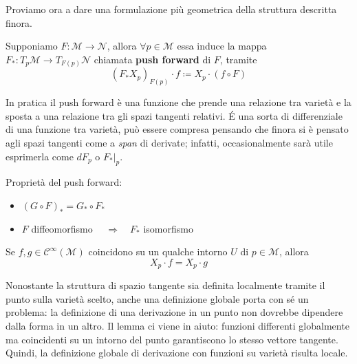 Proviamo ora a dare una formulazione più geometrica della struttura descritta finora.
\begin{definition}
    Supponiamo $F : \mathcal{M} \rightarrow \mathcal{N}$, allora $\forall p \in \mathcal{M}$ essa induce la mappa $F_* : T_p\mathcal{M} \rightarrow T_{F(p)}\mathcal{N}$ chiamata \textbf{push forward} di $F$, tramite
    \begin{equation}
        (F_* X_p)_{F(p)} \cdot f \coloneqq X_p \cdot (f \circ F)
    \end{equation}
\end{definition}
In pratica il push forward è una funzione che prende una relazione tra varietà e la sposta a una relazione tra gli spazi tangenti relativi.
\'E una sorta di differenziale di una funzione tra varietà, può essere compresa pensando che finora si è pensato agli spazi tangenti come a \emph{span} di derivate; infatti, occasionalmente sarà utile esprimerla come $dF_p$ o $F_*|_p$.
\begin{property} Proprietà del push forward:
    \begin{itemize}
        \item $(G \circ F)_* = G_* \circ F_*$
        \item $F$ diffeomorfismo  $\quad \Longrightarrow \quad F_*$ isomorfismo
    \end{itemize}
\end{property}
\begin{lemma}
    Se $f, g \in \mathcal{C}^\infty (\mathcal{M})$ coincidono su un qualche intorno $U$ di $p \in \mathcal{M}$, allora
    \[
        X_p \cdot f = X_p \cdot g
    \]
\end{lemma}
Nonostante la struttura di spazio tangente sia definita localmente tramite il punto sulla varietà scelto, anche una definizione globale porta con sé un problema: la definizione di una derivazione in un punto non dovrebbe dipendere dalla forma in un altro.
Il lemma ci viene in aiuto: funzioni differenti globalmente ma coincidenti su un intorno del punto garantiscono lo stesso vettore tangente.
Quindi, la definizione globale di derivazione con funzioni su varietà risulta locale.

